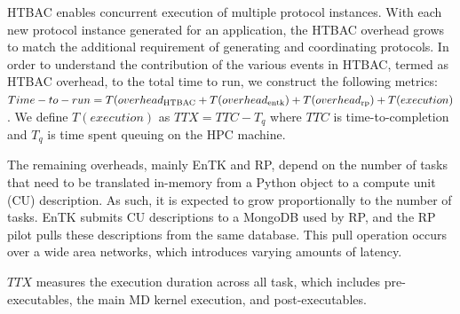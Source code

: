 HTBAC enables concurrent execution of multiple protocol instances.
With each new protocol instance generated for an
application, the HTBAC overhead grows to match the additional
requirement of generating and coordinating protocols. In order
to understand the contribution of the various events in HTBAC,
termed as HTBAC overhead, to the total time to run, we construct the following metrics:
\(Time-to-run = T(overhead\textsubscript{HTBAC} +
T(overhead\textsubscript{entk}) +
T(overhead\textsubscript{rp}) + T(execution)\). We define \(T(execution)\) as \(TTX = TTC - T_q\) where \(TTC\) is
time-to-completion and \(T_q\) is time spent queuing on the HPC machine.

The remaining overheads, mainly EnTK and RP, depend on the number of tasks that need to be
translated in-memory from a Python object to a compute unit (CU) description. As such, it is
expected to grow proportionally to the number of tasks. EnTK submits CU descriptions to a
MongoDB used by RP, and the RP pilot pulls these descriptions from the same database.
This pull operation occurs over a wide area networks, which introduces varying amounts of latency.

\(TTX\) measures the execution duration across all task, which includes pre-executables, the
main MD kernel execution, and post-executables.
